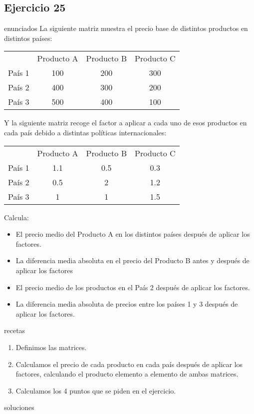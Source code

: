 \subsection{Ejercicio 25}
\def\parte{enunciados}
\ifx\capitulo\parte
La siguiente matriz muestra el precio base de distintos productos en distintos países:
\begin{center}
  \begin{tabular}[h]{cccc}
    &Producto A&Producto B&Producto C \\
    País 1&100&200&300 \\
    País 2&400&300&200 \\
    País 3&500&400&100
  \end{tabular}
\end{center}

Y la siguiente matriz recoge el factor a aplicar a cada uno de esos productos en cada país debido a distintas políticas internacionales:

\begin{center}
  \begin{tabular}[h]{cccc}
    &Producto A&Producto B&Producto C \\
    País 1&1.1&0.5&0.3 \\
    País 2&0.5&2&1.2 \\
    País 3&1&1&1.5
  \end{tabular}
\end{center}

Calcula:

\begin{itemize}
\item El precio medio del Producto A en los distintos países después de aplicar los factores.
\item La diferencia media absoluta en el precio del Producto B antes y después de aplicar los factores
\item El precio medio de los productos en el País 2 después de aplicar los factores.
\item La diferencia media absoluta de precios entre los países 1 y 3 después de aplicar los factores.
\end{itemize}
\fi

\def\parte{recetas}
\ifx\capitulo\parte
\begin{enumerate}
\item Definimos las matrices.
\item Calculamos el precio de cada producto en cada país después de aplicar los factores, calculando el producto elemento a elemento de ambas matrices.
\item Calculamos los 4 puntos que se piden en el ejercicio.
\end{enumerate}
\fi

\def\parte{soluciones}
\ifx\capitulo\parte

\fi
